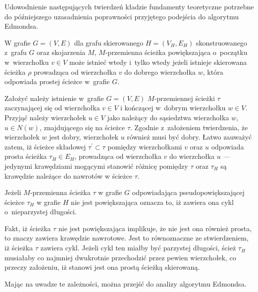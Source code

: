 {  Udowodnienie następujących twierdzeń kładzie fundamenty teoretyczne potrzebne do późniejszego uzasadnienia poprawności przyjętego podejścia do algorytmu Edmondsa.
  \begin{theorem}
    W grafie $G=(V, E)$ dla grafu skierowanego $H=(V_H,E_H)$ skonstruowanego z~grafu $G$ oraz skojarzenia $M$, $M$-przemienna ścieżka powiększająca o~początku w~wierzchołku $v \in V$ może istnieć wtedy i~tylko wtedy jeżeli istnieje skierowana ścieżka $\rho$ prowadząca od wierzchołka $v$ do dobrego wierzchołka $w$, która odpowiada prostej ścieżce w~grafie $G$.
  \end{theorem}
  \begin{bproof}
    Założyć należy istnienie w~grafie $G=(V, E)$ $M$-przemiennej ścieżki $\tau$ zaczynającej się od wierzchołka $v \in V$ i kończącej w~dobrym wierzchołku $w \in V$. Przyjąć należy wierzchołek $u \in V$ jako należący do sąsiedztwa wierzchołka $w$, $u \in N(w)$, znajdującego się na ścieżce $\tau$.
    Zgodnie z~założeniem twierdzenia, że wierzchołek $w$ jest dobry, wierzchołek $u$ również musi być dobry.
    Łatwo zauważyć zatem, iż ścieżce składowej $\tau^\prime \subset \tau$ pomiędzy wierzchołkami $v$ oraz $u$ odpowiada prosta ścieżka $\tau_H \in E_H$, prowadząca od wierzchołka $v$ do wierzchołka $u$ --- jedynymi krawędziami mogącymi stanowić różnicę pomiędzy $\tau$ oraz $\tau_H$ są krawędzie należące do nawrotów w ścieżce $\tau$.
  \end{bproof}
  \begin{theorem}
    Jeżeli $M$-przemienna ścieżka $\tau$ w grafie $G$ odpowiadająca pseudopowiększającej ścieżce $\tau_H$ w grafie $H$ nie jest powiększająca oznacza to, iż zawiera ona cykl o~nieparzystej długości.
  \end{theorem}
  \begin{bproof}
    Fakt, iż ścieżka $\tau$ nie jest powiększająca implikuje, że nie jest ona również prosta, to znaczy zawiera krawędzie nawrotowe.
    Jest to równoznaczne ze stwierdzeniem, iż ścieżka $\tau$ zawiera cykl.
    Jeżeli cykl ten miałby być parzystej długości, ścież $\tau_H$ musiałaby co najmniej dwukrotnie przechodzić przez pewien wierzchołek, co przeczy założeniu, iż stanowi jest ona prostą ścieżką skierowaną.
  \end{bproof}
  Mając na uwadze te zależności, można przejść do analizy algorytmu Edmondsa.
}
